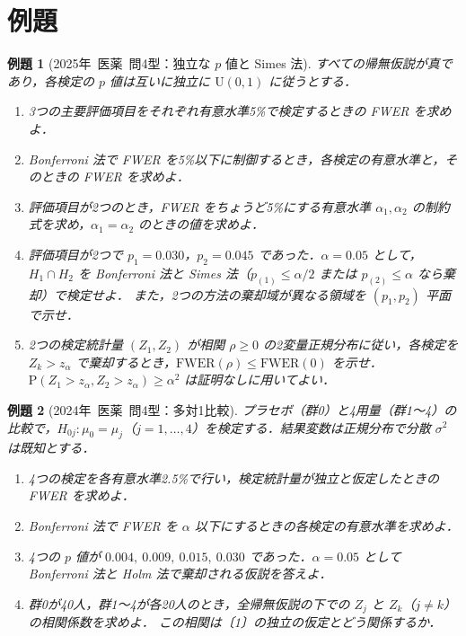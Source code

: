 \documentclass[a4paper,11pt,openany]{ltjsbook}
\newtheorem{reidai}{例題}[chapter]
\newcommand{\kakomon}[2]{\mbox{#1年 医薬 問#2}}
\newcommand{\Prob}{\mathrm{P}}
\newcommand{\Unif}{\mathrm{U}}
\begin{document}
\section{例題}\label{sec:m08-reidai}
\begin{reidai}[\kakomon{2025}{4}型：独立な $p$ 値と Simes 法]\label{reidai:m08-1}
すべての帰無仮説が真であり，各検定の $p$ 値は互いに独立に $\Unif(0,1)$ に従うとする．
\begin{enumerate}[label=〔\arabic*〕]
\item 3つの主要評価項目をそれぞれ有意水準5\%で検定するときの FWER を求めよ．
\item Bonferroni 法で FWER を5\%以下に制御するとき，各検定の有意水準と，そのときの FWER を求めよ．
\item 評価項目が2つのとき，FWER をちょうど5\%にする有意水準 $\alpha_1,\alpha_2$ の制約式を求め，$\alpha_1=\alpha_2$ のときの値を求めよ．
\item 評価項目が2つで $p_1=0.030$，$p_2=0.045$ であった．$\alpha=0.05$ として，$H_1\cap H_2$ を Bonferroni 法と Simes 法（$p_{(1)}\le\alpha/2$ または $p_{(2)}\le\alpha$ なら棄却）で検定せよ．
      また，2つの方法の棄却域が異なる領域を $(p_1,p_2)$ 平面で示せ．
\item 2つの検定統計量 $(Z_1,Z_2)$ が相関 $\rho\ge0$ の2変量正規分布に従い，各検定を $Z_k>z_\alpha$ で棄却するとき，$\mathrm{FWER}(\rho)\le\mathrm{FWER}(0)$ を示せ．
      $\Prob(Z_1>z_\alpha,Z_2>z_\alpha)\ge\alpha^2$ は証明なしに用いてよい．
\end{enumerate}
\end{reidai}

\begin{reidai}[\kakomon{2024}{4}型：多対1比較]\label{reidai:m08-2}
プラセボ（群0）と4用量（群1〜4）の比較で，$H_{0j}:\mu_0=\mu_j$（$j=1,\dots,4$）を検定する．結果変数は正規分布で分散 $\sigma^2$ は既知とする．
\begin{enumerate}[label=〔\arabic*〕]
\item 4つの検定を各有意水準2.5\%で行い，検定統計量が独立と仮定したときの FWER を求めよ．
\item Bonferroni 法で FWER を $\alpha$ 以下にするときの各検定の有意水準を求めよ．
\item 4つの $p$ 値が $0.004,\ 0.009,\ 0.015,\ 0.030$ であった．$\alpha=0.05$ として Bonferroni 法と Holm 法で棄却される仮説を答えよ．
\item 群0が40人，群1〜4が各20人のとき，全帰無仮説の下での $Z_j$ と $Z_k$（$j\ne k$）の相関係数を求めよ．
      この相関は〔1〕の独立の仮定とどう関係するか．
\end{enumerate}
\end{reidai}
\end{document}
